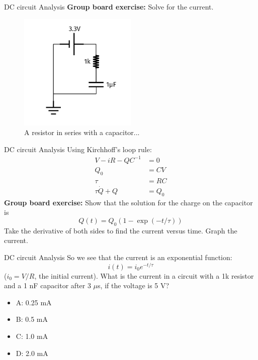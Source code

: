 \documentclass{beamer}
\begin{document}

\begin{frame}{DC circuit Analysis}
\textbf{Group board exercise:} Solve for the current.
\begin{figure}
\centering
\includegraphics[width=0.5\textwidth]{figures/iVCurve7.pdf}
\caption{\label{fig:iVCurve7} A resistor in series with a capacitor...}
\end{figure}
\end{frame}

\begin{frame}{DC circuit Analysis}
Using Kirchhoff's loop rule:
\begin{align}
V - iR - QC^{-1} &= 0 \\
Q_0 &= CV \\
\tau &= RC \\
\tau \dot{Q} + Q &= Q_0
\end{align}
\textbf{Group board exercise:} Show that the solution for the charge on the capacitor is
\begin{equation}
Q(t) = Q_0 \left(1 - \exp(-t/\tau)\right)
\end{equation}
Take the derivative of both sides to find the current versus time.  Graph the current.
\end{frame}

\begin{frame}{DC circuit Analysis}
So we see that the current is an exponential function:
\begin{equation}
i(t) = i_0 e^{-t/\tau}
\end{equation}
($i_0 = V/R$, the initial current).  What is the current in a circuit with a 1k resistor and a 1 nF capacitor after 3 $\mu$s, if the voltage is 5 V?
\begin{itemize}
\item A: 0.25 mA
\item B: 0.5 mA
\item C: 1.0 mA
\item D: 2.0 mA
\end{itemize}
\end{frame}
\end{document}

